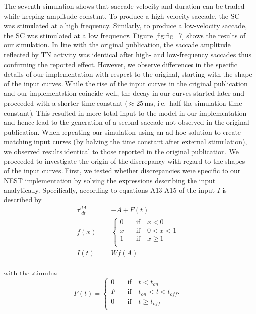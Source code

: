 \documentclass[10pt,a4paper,onecolumn]{article}
\begin{document}
The seventh simulation shows that saccade velocity and duration can be
traded while keeping amplitude constant. To produce a high-velocity
saccade, the SC was stimulated at a high frequency. Similarly, to
produce a low-velocity saccade, the SC was stimulated at a low
frequency. Figure \ref{fig:fig_7} shows the results of our simulation.
In line with the original publication, the saccade amplitude reflected
by TN activity was identical after high- and low-frequency saccades thus
confirming the reported effect. However, we observe differences in the
specific details of our implementation with respect to the original,
starting with the shape of the input curves. While the rise of the input
curves in the original publication and our implementation coincide well,
the decay in our curves started later and proceeded with a shorter time
constant (\(\approx25\,\mathrm{ms}\), i.e.~half the simulation time
constant). This resulted in more total input to the model in our
implementation and hence lead to the generation of a second saccade not
observed in the original publication. When repeating our simulation
using an ad-hoc solution to create matching input curves (by halving the
time constant after external stimulation), we observed results identical
to those reported in the original publication. We proceeded to
investigate the origin of the discrepancy with regard to the shapes of
the input curves. First, we tested whether discrepancies were specific
to our NEST implementation by solving the expressions describing the
input analytically. Specifically, according to equations A13-A15 of
\autocite{Gancarz1998} the input \(I\) is described by \[
\begin{array}{lll}
    \tau \frac{dA}{dt} &=-A+F(t)\\
    f(x) &=
    \left\{
    \begin{array}{lll}
        0 \quad &\textrm{if} \quad x<0 \\
        x \quad &\textrm{if} \quad 0<x<1 \\
        1 \quad &\textrm{if} \quad x \geq 1 \\
    \end{array}
    \right. \\
    I(t) &=Wf(A)
\end{array}
\]\\
with the stimulus \[
F(t)=
\left\{
\begin{array}{lll}
    0 \quad &\textrm{if} \quad t<{t}_{on} \\
    F \quad &\textrm{if} \quad {t}_{on}<t<{t}_{off} \textrm{.} \\
    0 \quad &\textrm{if} \quad t \geq {t}_{off} \\
\end{array}
\right.
\]\\
\end{document}
